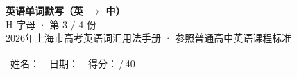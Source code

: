 \documentclass[10pt,a4paper]{article}
\begin{document}
\pagestyle{plain}

\begin{center}
{\LARGE\bfseries 英语单词默写（英 $\to$ 中）}\\[0.22em]
{\large H 字母 · 第 3 / 4 份}\\[0.18em]
{\small 2026年上海市高考英语词汇用法手册 · 参照普通高中英语课程标准}
\end{center}

\vspace{0.25em}
\noindent\begin{tabular}{@{}p{}@{}p{}@{}p{}@{}}
姓名：\underline{\hspace{2.0cm}} & 日期：\underline{\hspace{2.0cm}} & 得分：\underline{\hspace{1.3cm}}\,/\,40 \\
\end{tabular}

\vspace{0.3em}

\vspace{0.08em}
\end{document}
